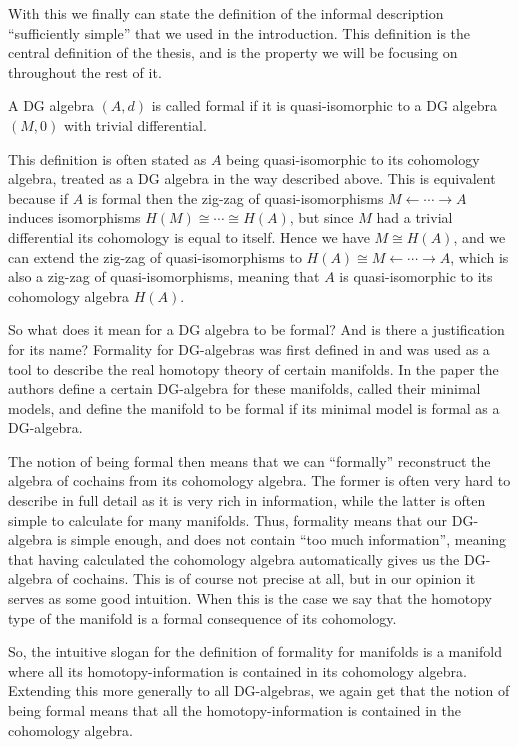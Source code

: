 With this we finally can state the definition of the informal description ``sufficiently simple'' that we used in the introduction. This definition is the central definition of the thesis, and is the property we will be focusing on throughout the rest of it. 

\begin{definition}
A DG algebra $(A, d)$ is called formal if it is quasi-isomorphic to a DG algebra $(M, 0)$ with trivial differential. 
\end{definition}

This definition is often stated as $A$ being quasi-isomorphic to its cohomology algebra, treated as a DG algebra in the way described above. This is equivalent because if $A$ is formal then the zig-zag of quasi-isomorphisms $M \leftarrow \cdots \rightarrow A$ induces isomorphisms $H(M)\cong \cdots \cong H(A)$, but since $M$ had a trivial differential its cohomology is equal to itself. Hence we have $M\cong H(A)$, and we can extend the zig-zag of quasi-isomorphisms to $H(A)\cong M \leftarrow \cdots \rightarrow A$, which is also a zig-zag of quasi-isomorphisms, meaning that $A$ is quasi-isomorphic to its cohomology algebra $H(A)$. 

So what does it mean for a DG algebra to be formal? And is there a justification for its name? Formality for DG-algebras was first defined in \cite{DGMS} and was used as a tool to describe the real homotopy theory of certain manifolds. In the paper the authors define a certain DG-algebra for these manifolds, called their minimal models, and define the manifold to be formal if its minimal model is formal as a DG-algebra. 

The notion of being formal then means that we can ``formally'' reconstruct the algebra of cochains from its cohomology algebra. The former is often very hard to describe in full detail as it is very rich in information, while the latter is often simple to calculate for many manifolds. Thus, formality means that our DG-algebra is simple enough, and does not contain ``too much information'', meaning that having calculated the cohomology algebra automatically gives us the DG-algebra of cochains. This is of course not precise at all, but in our opinion it serves as some good intuition. When this is the case we say that the homotopy type of the manifold is a formal consequence of its cohomology. 

So, the intuitive slogan for the definition of formality for manifolds is a manifold where all its homotopy-information is contained in its cohomology algebra. Extending this more generally to all DG-algebras, we again get that the notion of being formal means that all the homotopy-information is contained in the cohomology algebra.

